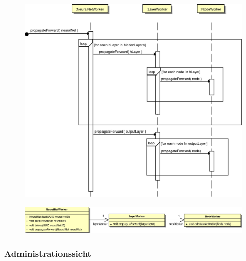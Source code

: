 \begin{figure}[H]
\begin{center}
\includegraphics[width=13cm]{Abbildungen/UML/uml_ronny/forwardPropagationSD.png}
\end{center}
\end{figure}

\begin{figure}[H]
\begin{center}
\includegraphics[width=\textwidth]{Abbildungen/UML/uml_ronny/workerKlassenDiagramm.png}
\end{center}
\end{figure}

\subsubsection{Administrationssicht}


